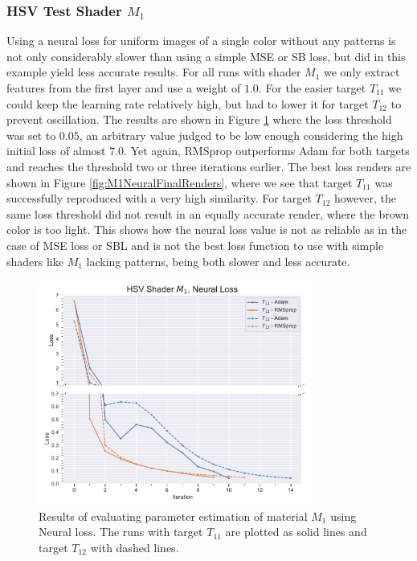 \subsubsection{HSV Test Shader $M_1$}


Using a neural loss for uniform images of a single color without any patterns is not only considerably slower than using a simple MSE or SB loss, but did in this example yield less accurate results. For all runs with shader $M_1$ we only extract features from the first layer and use a weight of $1.0$. For the easier target $T_{11}$ we could keep the learning rate relatively high, but had to lower it for target $T_{12}$ to prevent oscillation. The results are shown in Figure \ref{fig:M1NeuralData} where the loss threshold was set to $0.05$, an arbitrary value judged to be low enough considering the high initial loss of almost $7.0$. Yet again, RMSprop outperforms Adam for both targets and reaches the threshold two or three iterations earlier. The best loss renders are shown in Figure \ref{fig:M1NeuralFinalRenders}, where we see that target $T_{11}$ was successfully reproduced with a very high similarity. For target $T_{12}$ however, the same loss threshold did not result in an equally accurate render, where the brown color is too light. This shows how the neural loss value is not as reliable as in the case of MSE loss or SBL and is not the best loss function to use with simple shaders like $M_1$ lacking patterns, being both slower and less accurate.

\begin{figure}[hpt]
    \centering
    \includegraphics[width=0.8\textwidth]{img/evaluation/M1/HSV_NEURAL.pdf}
    \caption{Results of evaluating parameter estimation of material $M_1$ using Neural loss. The runs with target $T_{11}$ are plotted as solid lines and target $T_{12}$ with dashed lines.}
    \label{fig:M1NeuralData}
\end{figure}

